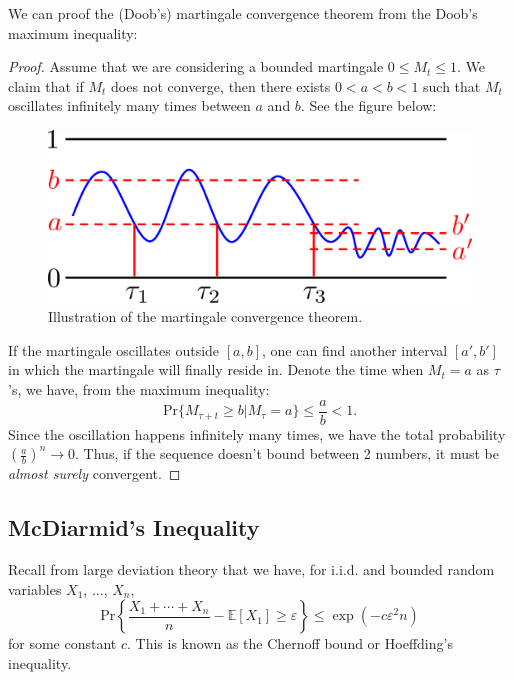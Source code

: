 We can proof the (Doob's) martingale convergence theorem from the Doob's maximum inequality:
\begin{proof}
    Assume that we are considering a bounded martingale $0\le M_t\le 1$. We claim that if $M_t$ does not converge, then there exists $0< a<b<1$ such that $M_t$ oscillates infinitely many times between $a$ and $b$. See the figure below:
    \begin{figure}[H]
        \centering
        \includegraphics[width=0.5\linewidth]{figures/w4_martingale_oscillate.png}
        \caption{Illustration of the martingale convergence theorem.}
    \end{figure}
    If the martingale oscillates outside $[a,b]$, one can find another interval $[a',b']$ in which the martingale will finally reside in. Denote the time when $M_t=a$ as $\tau$'s, we have, from the maximum inequality:
    \begin{equation}
        \mathrm{Pr}\{M_{\tau+t}\ge b\vert M_\tau=a\} \le \frac{a}{b} <1.
    \end{equation}
    Since the oscillation happens infinitely many times, we have the total probability $(\frac{a}{b})^n\rightarrow 0$. Thus, if the sequence doesn't bound between 2 numbers, it must be \textit{almost surely} convergent.
\end{proof}

\subsection{McDiarmid's Inequality}
Recall from large deviation theory that we have, for i.i.d. and bounded random variables $X_1$, $\ldots$, $X_n$,
\begin{equation}
    \mathrm{Pr}\left\{\frac{X_1+\cdots+X_n}{n} - \mathbb{E}[X_1] \ge \varepsilon\right\} \le \exp(-c\varepsilon^2n)
\end{equation}
for some constant $c$. This is known as the Chernoff bound or Hoeffding's inequality.

